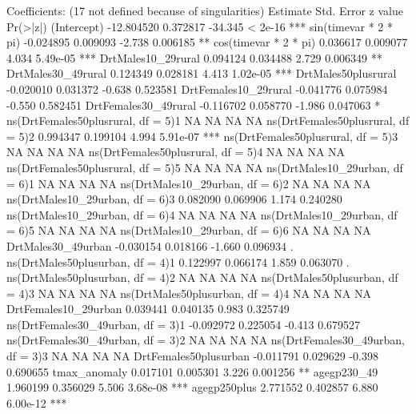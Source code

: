 \documentclass[a4paper]{article}                %
\begin{document}
\begin{Schunk}
\begin{Soutput}
Coefficients: (17 not defined because of singularities)
                                     Estimate Std. Error z value Pr(>|z|)    
(Intercept)                        -12.804520   0.372817 -34.345  < 2e-16 ***
sin(timevar * 2 * pi)               -0.024895   0.009093  -2.738 0.006185 ** 
cos(timevar * 2 * pi)                0.036617   0.009077   4.034 5.49e-05 ***
DrtMales10_29rural                   0.094124   0.034488   2.729 0.006349 ** 
DrtMales30_49rural                   0.124349   0.028181   4.413 1.02e-05 ***
DrtMales50plusrural                 -0.020010   0.031372  -0.638 0.523581    
DrtFemales10_29rural                -0.041776   0.075984  -0.550 0.582451    
DrtFemales30_49rural                -0.116702   0.058770  -1.986 0.047063 *  
ns(DrtFemales50plusrural, df = 5)1         NA         NA      NA       NA    
ns(DrtFemales50plusrural, df = 5)2   0.994347   0.199104   4.994 5.91e-07 ***
ns(DrtFemales50plusrural, df = 5)3         NA         NA      NA       NA    
ns(DrtFemales50plusrural, df = 5)4         NA         NA      NA       NA    
ns(DrtFemales50plusrural, df = 5)5         NA         NA      NA       NA    
ns(DrtMales10_29urban, df = 6)1            NA         NA      NA       NA    
ns(DrtMales10_29urban, df = 6)2            NA         NA      NA       NA    
ns(DrtMales10_29urban, df = 6)3      0.082090   0.069906   1.174 0.240280    
ns(DrtMales10_29urban, df = 6)4            NA         NA      NA       NA    
ns(DrtMales10_29urban, df = 6)5            NA         NA      NA       NA    
ns(DrtMales10_29urban, df = 6)6            NA         NA      NA       NA    
DrtMales30_49urban                  -0.030154   0.018166  -1.660 0.096934 .  
ns(DrtMales50plusurban, df = 4)1     0.122997   0.066174   1.859 0.063070 .  
ns(DrtMales50plusurban, df = 4)2           NA         NA      NA       NA    
ns(DrtMales50plusurban, df = 4)3           NA         NA      NA       NA    
ns(DrtMales50plusurban, df = 4)4           NA         NA      NA       NA    
DrtFemales10_29urban                 0.039441   0.040135   0.983 0.325749    
ns(DrtFemales30_49urban, df = 3)1   -0.092972   0.225054  -0.413 0.679527    
ns(DrtFemales30_49urban, df = 3)2          NA         NA      NA       NA    
ns(DrtFemales30_49urban, df = 3)3          NA         NA      NA       NA    
DrtFemales50plusurban               -0.011791   0.029629  -0.398 0.690655    
tmax_anomaly                         0.017101   0.005301   3.226 0.001256 ** 
agegp230_49                          1.960199   0.356029   5.506 3.68e-08 ***
agegp250plus                         2.771552   0.402857   6.880 6.00e-12 ***

\end{Soutput}
\end{Schunk}
\end{document}
